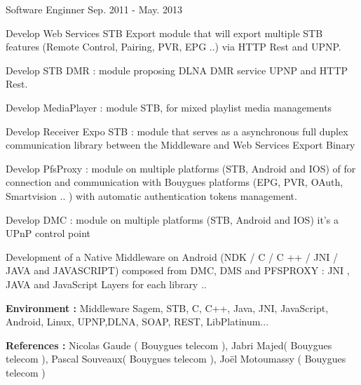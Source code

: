 \documentclass[11pt, a4paper]{awesome-cv} %
\begin{document}
\begin{cventries}
    \cventry
    {Software Enginner} %
    {}{}
    {Sep. 2011 - May. 2013}
    { %
        \begin{cvitems}
            \item {Develop Web Services STB Export module that will export multiple STB features (Remote Control, Pairing, PVR, EPG ..) via HTTP Rest and UPNP. }
            \item {Develop STB DMR : module proposing DLNA DMR service UPNP  and HTTP Rest. }
            \item {Develop MediaPlayer : module STB, for mixed playlist media managements}
            \item {Develop Receiver Expo STB : module that serves as a asynchronous full duplex communication library between the Middleware and Web Services Export Binary}
            \item {Develop PfsProxy : module on multiple platforms (STB, Android and IOS) of for connection and communication with Bouygues platforms (EPG, PVR, OAuth, Smartvision .. ) with automatic authentication tokens management.}
            \item {Develop DMC : module on multiple platforms (STB, Android and IOS)  it’s a UPnP control point }
            \item {Development of a Native Middleware on Android (NDK / C / C ++ / JNI / JAVA and JAVASCRIPT) composed from  DMC, DMS and PFSPROXY :
                        JNI , JAVA and JavaScript Layers for each library ..}
            \item { \textbf{Environment :}  Middleware Sagem, STB,   C, C++, Java, JNI, JavaScript, Android, Linux, UPNP,DLNA, SOAP, REST,  LibPlatinum...}
            \item { \textbf{References :}  Nicolas Gaude ( Bouygues telecom ), Jabri Majed( Bouygues telecom ), Pascal Souveaux( Bouygues telecom ), Joël Motoumassy ( Bouygues telecom )}
        \end{cvitems}
    }



\end{cventries}
\end{document}
